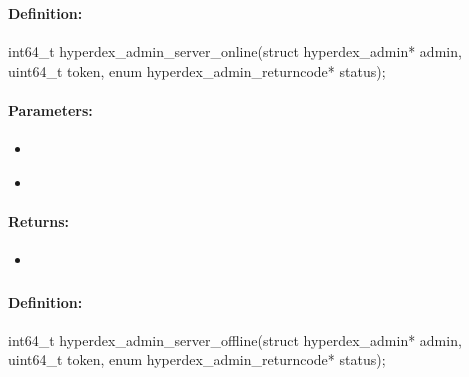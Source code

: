 \pagebreak
\subsubsection{}
\label{api:c:server_online}


\paragraph{Definition:}
\begin{ccode}
int64_t hyperdex_admin_server_online(struct hyperdex_admin* admin,
        uint64_t token,
        enum hyperdex_admin_returncode* status);
\end{ccode}

\paragraph{Parameters:}
\begin{itemize}[noitemsep]
\item {}\\

\item {}\\

\end{itemize}

\paragraph{Returns:}
\begin{itemize}[noitemsep]
\item {}\\

\end{itemize}

\pagebreak
\subsubsection{}
\label{api:c:server_offline}


\paragraph{Definition:}
\begin{ccode}
int64_t hyperdex_admin_server_offline(struct hyperdex_admin* admin,
        uint64_t token,
        enum hyperdex_admin_returncode* status);
\end{ccode}

